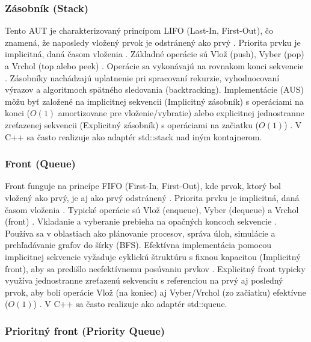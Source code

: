 \documentclass[11pt]{article}
\begin{document}
\subsubsection{Zásobník (Stack)}

Tento AUT je charakterizovaný princípom LIFO (Last-In, First-Out), čo znamená, že naposledy vložený prvok je odstránený ako prvý \cite{aus3}. Priorita prvku je implicitná, daná časom vloženia \cite{aus3}. Základné operácie sú Vlož (push), Vyber (pop) a Vrchol (top alebo peek) \cite{aus3}. Operácie sa vykonávajú na rovnakom konci sekvencie \cite{aus3}. Zásobníky nachádzajú uplatnenie pri spracovaní rekurzie, vyhodnocovaní výrazov a algoritmoch spätného sledovania (backtracking). Implementácie (AUS) môžu byť založené na implicitnej sekvencii (Implicitný zásobník) s operáciami na konci ($O(1)$ amortizovane pre vloženie/vybratie) alebo explicitnej jednostranne zreťazenej sekvencii (Explicitný zásobník) s operáciami na začiatku ($O(1)$) \cite{aus3}. V C++ sa často realizuje ako adaptér std::stack nad iným kontajnerom.

\subsubsection{Front (Queue)}

Front funguje na princípe FIFO (First-In, First-Out), kde prvok, ktorý bol vložený ako prvý, je aj ako prvý odstránený \cite{aus3}. Priorita prvku je implicitná, daná časom vloženia \cite{aus3}. Typické operácie sú Vlož (enqueue), Vyber (dequeue) a Vrchol (front) \cite{aus3}. Vkladanie a vyberanie prebieha na opačných koncoch sekvencie \cite{aus3}. Používa sa v oblastiach ako plánovanie procesov, správa úloh, simulácie a prehľadávanie grafov do šírky (BFS). Efektívna implementácia pomocou implicitnej sekvencie vyžaduje cyklickú štruktúru s fixnou kapacitou (Implicitný front), aby sa predišlo neefektívnemu posúvaniu prvkov \cite{aus3}. Explicitný front typicky využíva jednostranne zreťazenú sekvenciu s referenciou na prvý aj posledný prvok, aby boli operácie Vlož (na koniec) aj Vyber/Vrchol (zo začiatku) efektívne ($O(1)$) \cite{aus3}. V C++ sa často realizuje ako adaptér std::queue.

\subsubsection{Prioritný front (Priority Queue)}
\end{document}
